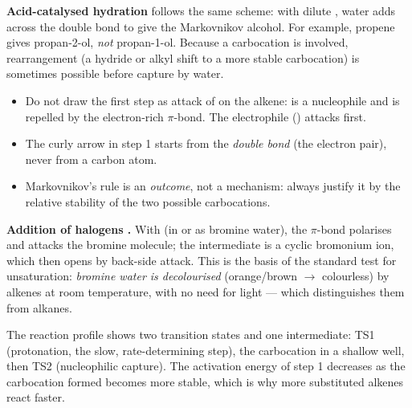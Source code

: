 \documentclass[11pt]{article}
\newcommand{\cle}[1]{{\popxbold\color{popdark}#1}}
\begin{document}
\noindent\textbf{Acid-catalysed hydration} follows the same scheme: with dilute , water adds across the double bond to give the Markovnikov alcohol. For example, propene gives propan-2-ol, \emph{not} propan-1-ol. Because a carbocation is involved, \cle{rearrangement} (a hydride or alkyl shift to a more stable carbocation) is sometimes possible before capture by water.

\begin{attention}
\begin{itemize}
\item Do not draw the first step as attack of  on the alkene:  is a nucleophile and is repelled by the electron-rich $\pi$-bond. The electrophile () attacks first.
\item The curly arrow in step 1 starts from the \emph{double bond} (the electron pair), never from a carbon atom.
\item Markovnikov's rule is an \emph{outcome}, not a mechanism: always justify it by the relative stability of the two possible carbocations.
\end{itemize}
\end{attention}

\noindent\textbf{Addition of halogens .} With  (in  or as bromine water), the $\pi$-bond polarises and attacks the bromine molecule; the intermediate is a cyclic \cle{bromonium ion}, which  then opens by back-side attack. This is the basis of the standard test for unsaturation: \emph{bromine water is decolourised} (orange/brown $\rightarrow$ colourless) by alkenes at room temperature, with no need for light — which distinguishes them from alkanes.

\begin{propriete}
The reaction profile shows two transition states and one intermediate: TS1 (protonation, the slow, rate-determining step), the carbocation in a shallow well, then TS2 (nucleophilic capture). The activation energy of step 1 decreases as the carbocation formed becomes more stable, which is why more substituted alkenes react faster.
\end{propriete}
\end{document}

